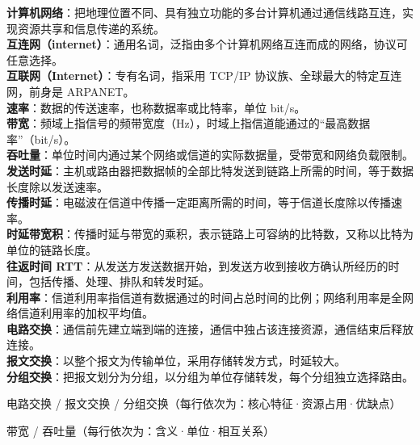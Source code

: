 \documentclass[a4paper,11pt]{article}
\begin{document}
\begin{keyterms}
\textbf{计算机网络}：把地理位置不同、具有独立功能的多台计算机通过通信线路互连，实现资源共享和信息传递的系统。\\
\textbf{互连网（internet）}：通用名词，泛指由多个计算机网络互连而成的网络，协议可任意选择。\\
\textbf{互联网（Internet）}：专有名词，指采用 TCP/IP 协议族、全球最大的特定互连网，前身是 ARPANET。\\
\textbf{速率}：数据的传送速率，也称数据率或比特率，单位 bit/s。\\
\textbf{带宽}：频域上指信号的频带宽度（Hz），时域上指信道能通过的“最高数据率”（bit/s）。\\
\textbf{吞吐量}：单位时间内通过某个网络或信道的实际数据量，受带宽和网络负载限制。\\
\textbf{发送时延}：主机或路由器把数据帧的全部比特发送到链路上所需的时间，等于数据长度除以发送速率。\\
\textbf{传播时延}：电磁波在信道中传播一定距离所需的时间，等于信道长度除以传播速率。\\
\textbf{时延带宽积}：传播时延与带宽的乘积，表示链路上可容纳的比特数，又称以比特为单位的链路长度。\\
\textbf{往返时间 RTT}：从发送方发送数据开始，到发送方收到接收方确认所经历的时间，包括传播、处理、排队和转发时延。\\
\textbf{利用率}：信道利用率指信道有数据通过的时间占总时间的比例；网络利用率是全网络信道利用率的加权平均值。\\
\textbf{电路交换}：通信前先建立端到端的连接，通信中独占该连接资源，通信结束后释放连接。\\
\textbf{报文交换}：以整个报文为传输单位，采用存储转发方式，时延较大。\\
\textbf{分组交换}：把报文划分为分组，以分组为单位存储转发，每个分组独立选择路由。
\end{keyterms}

\begin{contrast}{电路交换 / 报文交换 / 分组交换（每行依次为：核心特征·资源占用·优缺点）}
\end{contrast}

\begin{contrast}{带宽 / 吞吐量（每行依次为：含义·单位·相互关系）}
\end{contrast}
\end{document}
